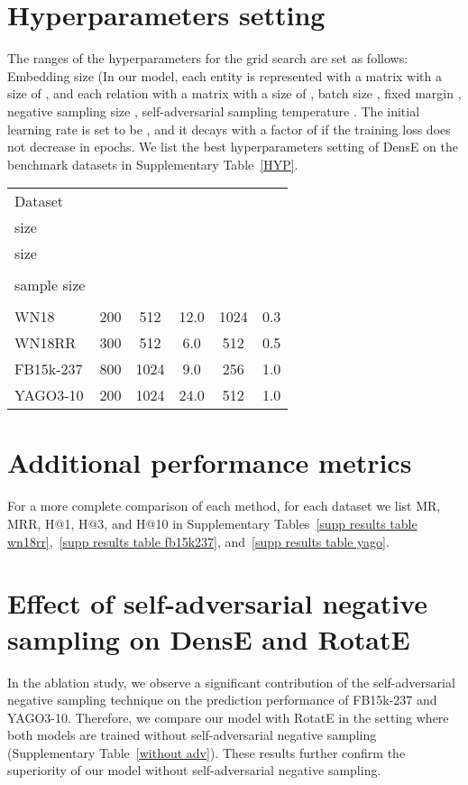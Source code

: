 \documentclass[11pt]{article}
\begin{document}
\section{Hyperparameters setting}
The ranges of the hyperparameters for the grid search are set as follows: Embedding size  (In our model, each entity is represented with a matrix with a size of , and each relation with a matrix with a size of , batch size , fixed margin , negative sampling size , self-adversarial sampling temperature  . The initial learning rate  is set to be , and it decays with a factor of  if the training loss does not decrease in  epochs. We list the best hyperparameters setting of DensE on the benchmark datasets in Supplementary Table~\ref{HYP}.
\begin{table*}[h!]
\centering
\caption{Hyperparameters settings of DensE in this study.}

 \begin{tabular}{ l c c c c c  }
  \toprule
  Dataset  & \Centerstack{Embedding \\ size } & \Centerstack{Batch \\ size }  & \Centerstack{Margin \\ }  & \Centerstack{Negative \\sample size }  & \Centerstack{adv temperature \\ } \\  
  \midrule
  WN18  & 200    & 512  & 12.0   & 1024   & 0.3 \\ 
  WN18RR & 300   & 512  & 6.0  & 512  & 0.5   \\
  FB15k-237 & 800   & 1024  & 9.0   & 256   & 1.0\\ 
  YAGO3-10    & 200    & 1024  & 24.0   & 512   & 1.0 \\ 
 \bottomrule
\end{tabular} 
\label{HYP}
\end{table*}





\section{Additional performance metrics}

For a more complete comparison of each method, for each dataset we list MR, MRR, H@1, H@3, and H@10 in Supplementary Tables~\ref{supp results table wn18rr},~\ref{supp results table fb15k237}, and~\ref{supp results table yago}.

\section{Effect of self-adversarial negative sampling on DensE and RotatE}
In the ablation study, we observe a significant contribution of the self-adversarial negative sampling technique on the prediction performance of FB15k-237 and YAGO3-10. Therefore, we compare our model with RotatE in the setting where both models are trained without self-adversarial negative sampling (Supplementary Table~\ref{without adv}). These results further confirm the superiority of our model without self-adversarial negative sampling.
\end{document}
